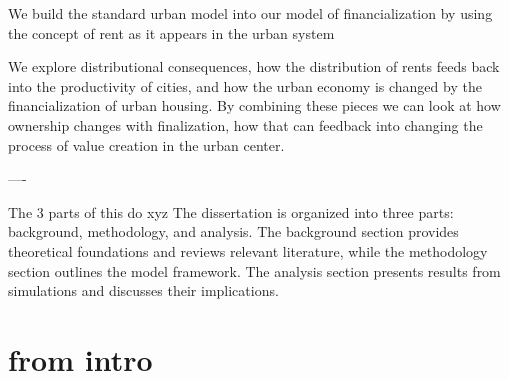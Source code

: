 








We build the  standard urban model into our model of financialization by using the concept of rent as it appears in the urban system


We explore distributional consequences, how the distribution of rents feeds back into the productivity of cities, and how the urban economy is changed by the financialization of urban housing. %
By combining these pieces we can look at how ownership changes with finalization, how that can feedback into changing the process of value creation in the urban center.





----

The 3 parts of this do xyz
The dissertation is organized into three parts: background, methodology, and analysis. The background section provides theoretical foundations and reviews relevant literature, while the methodology section outlines the model framework. The analysis section presents results from simulations and discusses their implications.




\section{from intro}

